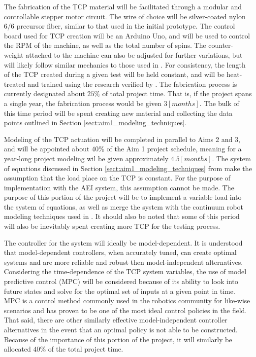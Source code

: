 		The fabrication of the TCP material will be facilitated through a modular and controllable stepper motor circuit. The wire of choice will be silver-coated nylon 6/6 precursor fiber, similar to that used in the initial prototype. The control board used for TCP creation will be an Arduino Uno, and will be used to control the RPM of the machine, as well as the total number of spins. The counter-weight attached to the machine can also be adjusted for further variations, but will likely follow similar mechanics to those used in \cite{wu_compact_2017, haines_new_2016, saharan_novel_2019}. For consistency, the length of the TCP created during a given test will be held constant, and will be heat-treated and trained using the research verified by \cite{wu_compact_2017, haines_new_2016}. The fabrication process is currently designated about $25\%$ of total project time. That is, if the project spans a single year, the fabrication process would be given $3[months]$. The bulk of this time period will be spent creating new material and collecting the data points outlined in Section \ref{sect:aim1_modeling_techniques}.
	
		Modeling of the TCP actuation will be completed in parallel to Aims 2 and 3, and will be appointed about $40\%$ of the Aim 1 project schedule, meaning for a year-long project modeling wil be given approximately $4.5[months]$. The system of equations discussed in Section \ref{sect:aim1_modeling_techniques} from \cite{wu_compact_2017} make the assumption that the load place on the TCP is constant. For the purpose of implementation with the AEI system, this assumption cannot be made. The purpose of this portion of the project will be to implement a variable load into the system of equations, as well as merge the system with the continuum robot modeling techniques used in \cite{rao_how_2021}. It should also be noted that some of this period will also be inevitably spent creating more TCP for the testing process.

		The controller for the system will ideally be model-dependent. It is understood that model-dependent controllers, when accurately tuned, can create optimal systems and are more reliable and robust then model-independent alternatives. Considering the time-dependence of the TCP system variables, the use of model predictive control (MPC) will be considered because of its ability to look into future states and solve for the optimal set of inputs at a given point in time. MPC is a control method commonly used in the robotics community for like-wise scenarios and has proven to be one of the most ideal control policies in the field. That said, there are other similarly effective model-independent controller alternatives in the event that an optimal policy is not able to be constructed. Because of the importance of this portion of the project, it will similarly be allocated $40\%$ of the total project time.
		

